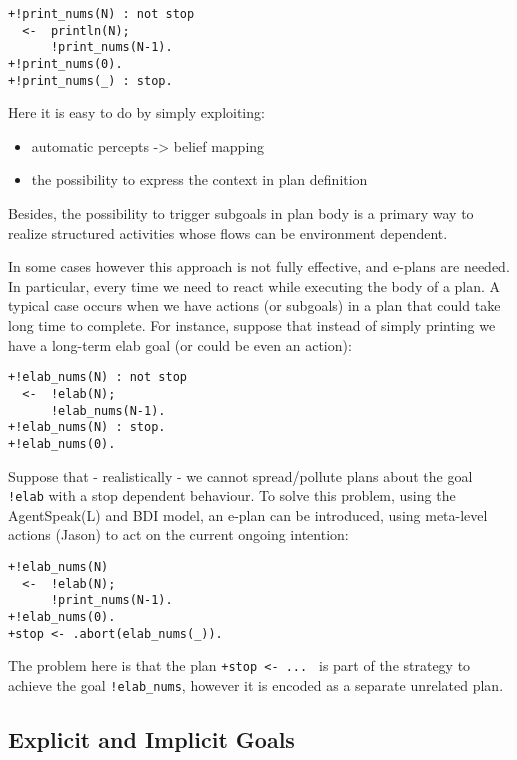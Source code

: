 \begin{verbatim}
+!print_nums(N) : not stop 
  <-  println(N);
      !print_nums(N-1).
+!print_nums(0).
+!print_nums(_) : stop.
\end{verbatim}
	
\noindent Here it is easy to do by simply exploiting:
%
\begin{itemize}
\item automatic percepts -> belief mapping
\item the possibility to express the context in plan definition
\end{itemize}

\noindent Besides, the possibility to trigger subgoals in plan body is  a primary way to realize structured activities whose flows can be environment dependent.

In some cases however this approach is not fully effective, and e-plans are needed. 
%
In particular, every time we need to react while executing the body of a plan. A typical case occurs when we have actions (or subgoals) in a plan that could take long time to complete.
%
For instance, suppose that instead of simply printing we have a long-term elab goal (or could be even an action):

\begin{verbatim}
+!elab_nums(N) : not stop 
  <-  !elab(N);
      !elab_nums(N-1).
+!elab_nums(N) : stop. 
+!elab_nums(0).
\end{verbatim}

\noindent Suppose that - realistically - we cannot spread/pollute plans about the goal \texttt{!elab} with a stop dependent behaviour.
%
To solve this problem, using the AgentSpeak(L) and BDI model, an e-plan can be introduced,
using meta-level actions (Jason) to act on the current ongoing intention:

\begin{verbatim}
+!elab_nums(N)
  <-  !elab(N);
      !print_nums(N-1).		
+!elab_nums(0).
+stop <- .abort(elab_nums(_)).
\end{verbatim}

\noindent The problem here is that the plan \texttt{+stop <- ... } is part of the strategy to achieve the goal \texttt{!elab\_nums}, however it is encoded as a separate unrelated plan.


\subsection{Explicit and Implicit Goals}

